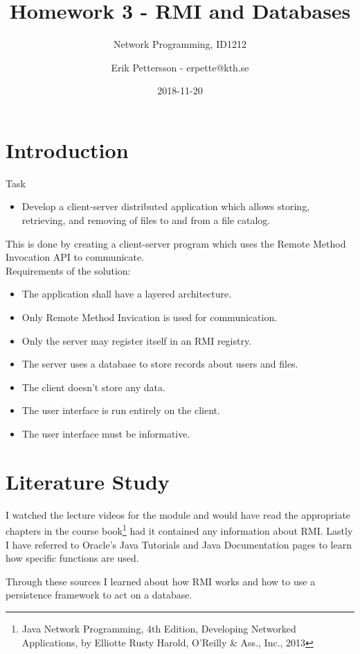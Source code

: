 \documentclass[a4paper]{scrartcl}
\title{Homework 3 - RMI and Databases}
\subtitle{Network Programming, ID1212}
\author{Erik Pettersson - erpette@kth.se}
\date{2018-11-20}
\begin{document}
\maketitle

\section{Introduction}

Task
\begin{itemize}
\item{Develop a client-server distributed application which allows storing, retrieving, and removing of files to and from a file catalog.}
\end{itemize}

This is done by creating a client-server program which uses the Remote Method Invocation API to communicate.\\

Requirements of the solution:
\begin{itemize}
\item{The application shall have a layered architecture.}
\item{Only Remote Method Invication is used for communication.}
\item{Only the server may register itself in an RMI registry.}
\item{The server uses a database to store records about users and files.}
\item{The client doesn't store any data.}
\item{The user interface is run entirely on the client.}
\item{The user interface must be informative.}
\end{itemize}

\section{Literature Study}

I watched the lecture videos for the module and would have read the appropriate chapters in the course book\footnote{Java Network Programming, 4th Edition, Developing Networked Applications, by Elliotte Rusty Harold, O'Reilly \& Ass., Inc., 2013} had it contained any information about RMI.
Lastly I have referred to Oracle's Java Tutorials and Java Documentation pages to learn how specific functions are used.

Through these sources I learned about how RMI works and how to use a persistence framework to act on a database.
\end{document}
